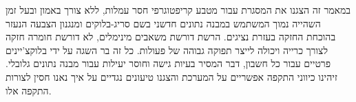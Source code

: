 
במאמר זה הצגנו את המסגרת עבור מטבע קריפטוגרפי חסר עמלות, ללא צורך באמון ובעל זמן השהייה נמוך המשתמש במבנה נתונים חדשני בשם סריג-בלוקים ומנגנון הצבעה הנעזר בהוכחת החזקה בעזרת נציגים. הרשת דורשת משאבים מינימלים, לא דורשת חומרה חזקה לצורך כרייה ויכולה לייצר תפוקה גבוהה של פעולות. כל זה בר השגה על ידי בלוקצ'יינים פרטיים עבור כל חשבון, דבר המסיר בעיות גישה וחוסר יעילות עבור מבנה נתונים גלובלי. זיהינו כיווני התקפה אפשריים על המערכת והצגנו טיעונים נגדיים על איך נאנו חסין לצורות התקפה אלו.